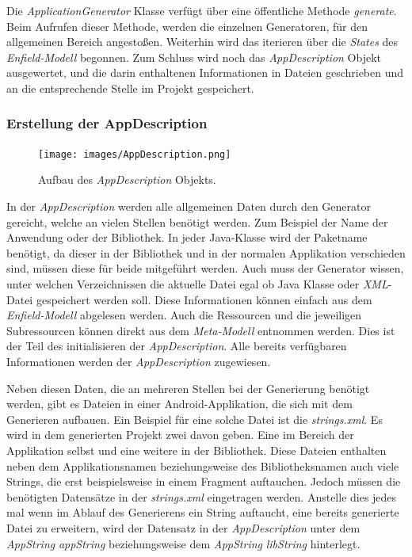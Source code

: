 Die \textit{ApplicationGenerator} Klasse verfügt über eine öffentliche Methode \textit{generate}. Beim Aufrufen dieser Methode, werden die einzelnen Generatoren, für den allgemeinen Bereich angestoßen. Weiterhin wird das iterieren über die \textit{States} des \textit{Enfield-Modell} begonnen. Zum Schluss wird noch das \textit{AppDescription} Objekt ausgewertet, und die darin enthaltenen Informationen in Dateien geschrieben und an die entsprechende Stelle im Projekt gespeichert.

\subsubsection{Erstellung der AppDescription}

\begin{figure}[H]
	\begin{center}
		\texttt{[image: images/AppDescription.png]}
		\caption{Aufbau des \textit{AppDescription} Objekts.}
		\label{fig:appDescription}
	\end{center}
\end{figure}

In der \textit{AppDescription} werden alle allgemeinen Daten durch den Generator gereicht, welche an vielen Stellen benötigt werden. 
Zum Beispiel der Name der Anwendung oder der Bibliothek. In jeder Java-Klasse wird der Paketname benötigt, da dieser in der Bibliothek und in der normalen Applikation verschieden sind, müssen diese für beide mitgeführt werden. Auch muss der Generator wissen, unter welchen Verzeichnissen die aktuelle Datei egal ob Java Klasse oder \textit{XML}-Datei gespeichert werden soll. 
Diese Informationen können einfach aus dem \textit{Enfield-Modell} abgelesen werden. Auch die Ressourcen und die jeweiligen Subressourcen können direkt aus dem \textit{Meta-Modell} entnommen werden.  Dies ist der Teil des initialisieren der \textit{AppDescription}. Alle bereits verfügbaren Informationen werden der \textit{AppDescription} zugewiesen. 

\newpage

Neben diesen Daten, die an mehreren Stellen bei der Generierung benötigt werden, gibt es Dateien in einer Android-Applikation, die sich mit dem Generieren aufbauen. Ein Beispiel für eine solche Datei ist die \textit{strings.xml}. 
Es wird in dem generierten Projekt zwei davon geben. Eine im Bereich der Applikation selbst und eine weitere in der Bibliothek. Diese Dateien enthalten neben dem Applikationsnamen beziehungsweise des Bibliotheksnamen auch viele Strings, die erst beispielsweise in einem Fragment auftauchen. Jedoch müssen die benötigten Datensätze in der \textit{strings.xml} eingetragen werden. Anstelle dies jedes mal wenn im Ablauf des Generierens ein String auftaucht, eine bereits generierte Datei zu erweitern, wird der Datensatz in der \textit{AppDescription} unter dem \textit{AppString} \textit{appString} beziehungsweise dem \textit{AppString} \textit{libString} hinterlegt.

